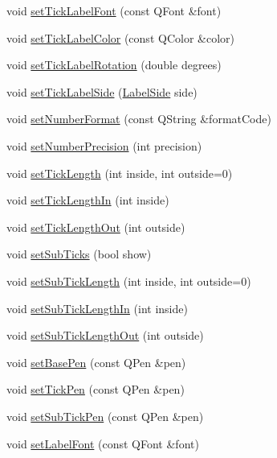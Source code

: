 \begin{DoxyCompactItemize}
\item 
void \hyperlink{classQCPAxis_a2b8690c4e8dbc39d9185d2b398ce7a6c}{set\+Tick\+Label\+Font} (const Q\+Font \&font)
\item 
void \hyperlink{classQCPAxis_a395e445c3fe496b935bee7b911ecfd1c}{set\+Tick\+Label\+Color} (const Q\+Color \&color)
\item 
void \hyperlink{classQCPAxis_a1bddd4413df8a576b7ad4b067fb33375}{set\+Tick\+Label\+Rotation} (double degrees)
\item 
void \hyperlink{classQCPAxis_a13ec644fc6e22715744c92c6dfa4f0fa}{set\+Tick\+Label\+Side} (\hyperlink{classQCPAxis_a24b13374b9b8f75f47eed2ea78c37db9}{Label\+Side} side)
\item 
void \hyperlink{classQCPAxis_ae585a54dc2aac662e90a2ca82f002590}{set\+Number\+Format} (const Q\+String \&format\+Code)
\item 
void \hyperlink{classQCPAxis_a21dc8023ad7500382ad9574b48137e63}{set\+Number\+Precision} (int precision)
\item 
void \hyperlink{classQCPAxis_a62ec40bebe3540e9c1479a8fd2be3b0d}{set\+Tick\+Length} (int inside, int outside=0)
\item 
void \hyperlink{classQCPAxis_afae1a37a99611366275a51204d991739}{set\+Tick\+Length\+In} (int inside)
\item 
void \hyperlink{classQCPAxis_a3b8a0debd1ffedd2c22d0592dfbb4e62}{set\+Tick\+Length\+Out} (int outside)
\item 
void \hyperlink{classQCPAxis_afa0ce8d4d0015ed23dcde01f8bc30106}{set\+Sub\+Ticks} (bool show)
\item 
void \hyperlink{classQCPAxis_ab702d6fd42fc620607435339a1c2a2e1}{set\+Sub\+Tick\+Length} (int inside, int outside=0)
\item 
void \hyperlink{classQCPAxis_ac46fa2a993a9f5789540977610acf1de}{set\+Sub\+Tick\+Length\+In} (int inside)
\item 
void \hyperlink{classQCPAxis_a4c6dfc3963492ed72a77724012df5f23}{set\+Sub\+Tick\+Length\+Out} (int outside)
\item 
void \hyperlink{classQCPAxis_a778d45fb71b3c7ab3bb7079e18b058e4}{set\+Base\+Pen} (const Q\+Pen \&pen)
\item 
void \hyperlink{classQCPAxis_ad80923bcc1c5da4c4db602c5325e797e}{set\+Tick\+Pen} (const Q\+Pen \&pen)
\item 
void \hyperlink{classQCPAxis_aede4028ae7516bd51a60618a8233f9cf}{set\+Sub\+Tick\+Pen} (const Q\+Pen \&pen)
\item 
void \hyperlink{classQCPAxis_a71ac1a47f7547e490a8c4311d1433cf3}{set\+Label\+Font} (const Q\+Font \&font)

\end{DoxyCompactItemize}
